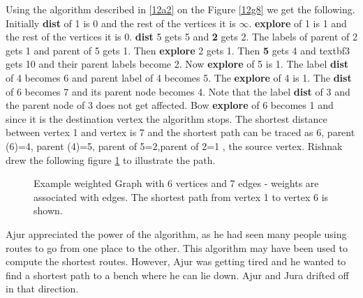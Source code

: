 Using the algorithm described in \ref{12a2} on the Figure \ref{12g8} we get the following.
Initially \textbf{dist} of 1 is 0 and the rest of the vertices it is $\infty$. \textbf{explore} of 1 is 1 and the rest of the vertices it is 0. \textbf{dist} 5 gets 5 and \textbf{2} gets 2. The labels of parent of 2 gets 1 and parent of 5 gets 1. Then \textbf{explore} 2 gets 1. Then \textbf{5} gets 4 and textbf{3} gets 10 and their parent labels become 2. Now \textbf{explore} of 5 is 1. The label \textbf{dist} of 4 becomes 6 and parent label of 4 becomes 5. The \textbf{explore} of 4 is 1. The \textbf{dist} of 6 becomes 7 and its parent node becomes 4. Note that the label \textbf{dist} of 3 and the parent node of 3 does not get affected. Bow \textbf{explore} of 6 becomes 1 and since it is the destination vertex the algorithm stops. The shortest distance between vertex 1 and vertex is 7 and the shortest path can be traced as 6, parent (6)=4, parent (4)=5, parent of 5=2,parent of 2=1 , the source vertex.
Rishnak drew the following figure \ref{12g9} to illustrate the path.

\begin{figure}
\begin{center}
\caption{ Example weighted Graph with 6 vertices and 7 edges - weights are associated with edges. The shortest path from vertex 1 to vertex 6 is shown.}\label{12g9}
\end{center}
\end{figure}

Ajur appreciated the power of the algorithm, as he had seen many people using routes to go from one place to the other. This algorithm may have been used to compute the shortest routes. However, Ajur was getting tired and he wanted to find a shortest path to a bench where he can lie down. Ajur and Jura drifted off in that direction.